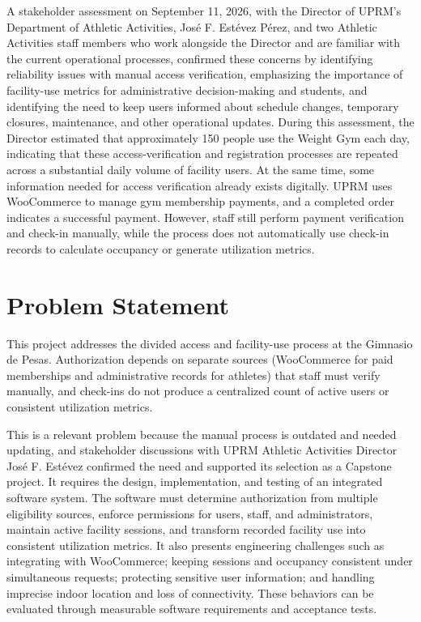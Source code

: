 \documentclass[11pt,letterpaper]{article}
\begin{document}
A stakeholder assessment on September 11, 2026, with the Director of UPRM's Department of Athletic Activities, José F. Estévez Pérez, and two Athletic Activities staff members who work alongside the Director and are familiar with the current operational processes, confirmed these concerns by identifying reliability issues with manual access verification, emphasizing the importance of facility-use metrics for administrative decision-making and students, and identifying the need to keep users informed about schedule changes, temporary closures, maintenance, and other operational updates. During this assessment, the Director estimated that approximately 150 people use the Weight Gym each day, indicating that these access-verification and registration processes are repeated across a substantial daily volume of facility users. At the same time, some information needed for access verification already exists digitally. UPRM uses WooCommerce to manage gym membership payments, and a completed order indicates a successful payment. However, staff still perform payment verification and check-in manually, while the process does not automatically use check-in records to calculate occupancy or generate utilization metrics.


\section{Problem Statement}

This project addresses the divided access and facility-use process at the Gimnasio de Pesas. Authorization depends on separate sources (WooCommerce for paid memberships and administrative records for athletes) that staff must verify manually, and check-ins do not produce a centralized count of active users or consistent utilization metrics.

This is a relevant problem because the manual process is outdated and needed updating, and stakeholder discussions with UPRM Athletic Activities Director José F. Estévez confirmed the need and supported its selection as a Capstone project. It requires the design, implementation, and testing of an integrated software system. The software must determine authorization from multiple eligibility sources, enforce permissions for users, staff, and administrators, maintain active facility sessions, and transform recorded facility use into consistent utilization metrics. It also presents engineering challenges such as integrating with WooCommerce; keeping sessions and occupancy consistent under simultaneous requests; protecting sensitive user information; and handling imprecise indoor location and loss of connectivity. These behaviors can be evaluated through measurable software requirements and acceptance tests.
\end{document}
